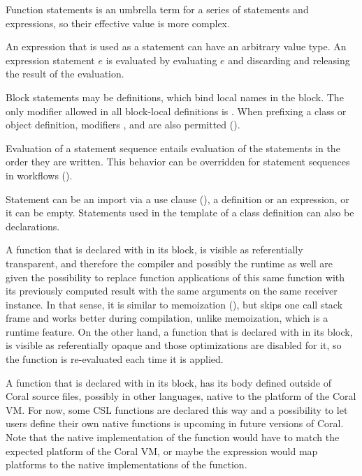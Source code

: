 Function statements is an umbrella term for a series of statements and expressions, so their effective value is more complex. 

An expression that is used as a statement can have an arbitrary value type. An expression statement $e$ is evaluated by evaluating $e$ and discarding and releasing the result of the evaluation. 

Block statements may be definitions, which bind local names in the block. The only modifier allowed in all block-local definitions is . When prefixing a class or object definition, modifiers ,  and  are also permitted ().

Evaluation of a statement sequence entails evaluation of the statements in the order they are written. This behavior can be overridden for statement sequences in workflows ().

Statement can be an import via a use clause (), a definition or an expression, or it can be empty. Statements used in the template of a class definition can also be declarations. 

A function that is declared with  in its  block, is visible as referentially transparent, and therefore the compiler and possibly the runtime as well are given the possibility to replace function applications of this same function with its previously computed result with the same arguments on the same receiver instance. In that sense, it is similar to memoization (), but skips one call stack frame and works better during compilation, unlike memoization, which is a runtime feature. On the other hand, a function that is declared with  in its  block, is visible as referentially opaque and those optimizations are disabled for it, so the function is re-evaluated each time it is applied. 

A function that is declared with  in its  block, has its body defined outside of Coral source files, possibly in other languages, native to the platform of the Coral VM. For now, some CSL functions are declared this way and a possibility to let users define their own native functions is upcoming in future versions of Coral. Note that the native implementation of the function would have to match the expected platform of the Coral VM, or maybe the expression would map platforms to the native implementations of the function. 

